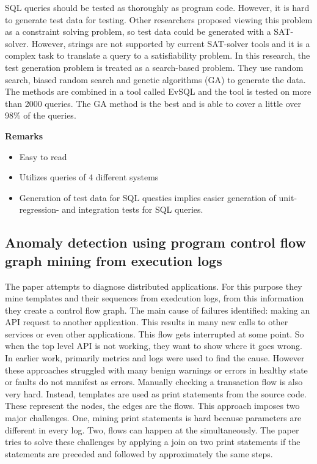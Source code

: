 \documentclass[]{book}
\providecommand{\tightlist}{%
  \setlength{\itemsep}{0pt}\setlength{\parskip}{0pt}}
\begin{document}
SQL queries should be tested as thoroughly as program code. However, it
is hard to generate test data for testing. Other researchers proposed
viewing this problem as a constraint solving problem, so test data could
be generated with a SAT-solver. However, strings are not supported by
current SAT-solver tools and it is a complex task to translate a query
to a satisfiability problem. In this research, the test generation
problem is treated as a search-based problem. They use random search,
biased random search and genetic algorithms (GA) to generate the data.
The methods are combined in a tool called EvSQL and the tool is tested
on more than 2000 queries. The GA method is the best and is able to
cover a little over 98\% of the queries.

\textbf{Remarks}

\begin{itemize}
\tightlist
\item
  Easy to read
\item
  Utilizes queries of 4 different systems
\item
  Generation of test data for SQL questies implies easier generation of
  unit- regression- and integration tests for SQL queries.
\end{itemize}

\subsection{Anomaly detection using program control flow graph mining
from execution
logs}\label{anomaly-detection-using-program-control-flow-graph-mining-from-execution-logs}

The paper attempts to diagnose distributed applications. For this
purpose they mine templates and their sequences from exedcution logs,
from this information they create a control flow graph. The main cause
of failures identified: making an API request to another application.
This results in many new calls to other services or even other
applications. This flow gets interrupted at some point. So when the top
level API is not working, they want to show where it goes wrong. In
earlier work, primarily metrics and logs were used to find the cause.
However these approaches struggled with many benign warnings or errors
in healthy state or faults do not manifest as errors. Manually checking
a transaction flow is also very hard. Instead, templates are used as
print statements from the source code. These represent the nodes, the
edges are the flows. This approach imposes two major challenges. One,
mining print statements is hard because parameters are different in
every log. Two, flows can happen at the simultaneously. The paper tries
to solve these challenges by applying a join on two print statements if
the statements are preceded and followed by approximately the same
steps.
\end{document}
